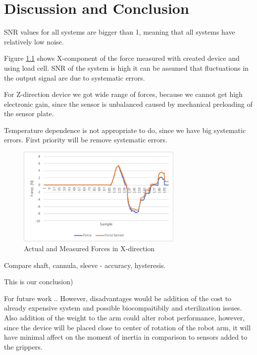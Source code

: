 \chapter{Discussion and Conclusion}
\label{discuss} %

SNR values for all systems are bigger than 1, meaning that all systems have relatively low noise.

Figure \ref{fig:Syst_err} shows X-component of the force measured with created device and using load cell. SNR of the system is high  it can be assumed that fluctuations in the output signal are due to systematic errors. 

For Z-direction device we got wide range of forces, because we cannot get high electronic gain, since the sensor is unbalanced caused by mechanical preloading of the sensor plate.

Temperature dependence is not appropriate to do, since we have big systematic errors. First priority will be remove systematic errors.

\begin{figure}[h]
	\begin{center}
	\includegraphics[width=80mm]{fig/results/syst_error.pdf}
	\end{center}
	\vspace{-4mm}
	\caption[Actual and Measured Forces in X-direction]
	{Actual and Measured Forces in X-direction}
	\label{fig:Syst_err}
	\vspace{-2mm}
\end{figure}

Compare shaft, cannula, sleeve - accuracy, hysteresis.

This is our conclusion)

For future work ..
However, disadvantages would be addition of the cost to already expensive system and possible biocompaitibily and sterilization issues. Also addition of the weight to the arm could alter robot performance, however, since the device will be placed close to center of rotation of the robot arm, it will have minimal affect on the moment of inertia  in comparison to sensors added to the grippers.

